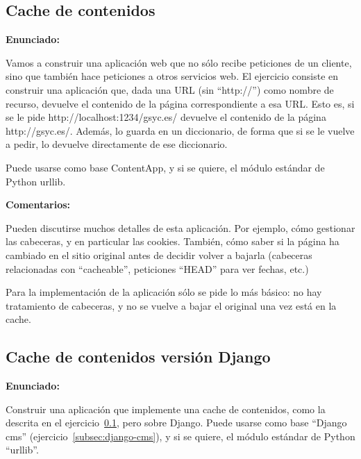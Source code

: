 \subsection{Cache de contenidos}
\label{subsec:cache-contenidos}

\textbf{Enunciado:}

Vamos a construir una aplicación web que no sólo recibe peticiones de un cliente, sino que también hace peticiones a otros servicios web. El ejercicio consiste en construir una aplicación que, dada una URL (sin ``http://'') como nombre de recurso, devuelve el contenido de la página correspondiente a esa URL. Esto es, si se le pide http://localhost:1234/gsyc.es/ devuelve el contenido de la página http://gsyc.es/. Además, lo guarda en un diccionario, de forma que si se le vuelve a pedir, lo devuelve directamente de ese diccionario.

Puede usarse como base ContentApp, y si se quiere, el módulo estándar de Python urllib.

\textbf{Comentarios:}

Pueden discutirse muchos detalles de esta aplicación. Por ejemplo, cómo gestionar las cabeceras, y en particular las cookies. También, cómo saber si la página ha cambiado en el sitio original antes de decidir volver a bajarla (cabeceras relacionadas con ``cacheable'', peticiones ``HEAD'' para ver fechas, etc.)

Para la implementación de la aplicación sólo se pide lo más básico: no hay tratamiento de cabeceras, y no se vuelve a bajar el original una vez está en la cache.

\subsection{Cache de contenidos versión Django}
\label{subsec:cache-contenidos-django}

\textbf{Enunciado:}

Construir una aplicación que implemente una cache de contenidos, como la descrita en el ejercicio~\ref{subsec:cache-contenidos}, pero sobre Django.
Puede usarse como base ``Django cms'' (ejercicio~\ref{subsec:django-cms}), y si se quiere, el módulo estándar de Python ``urllib''.

